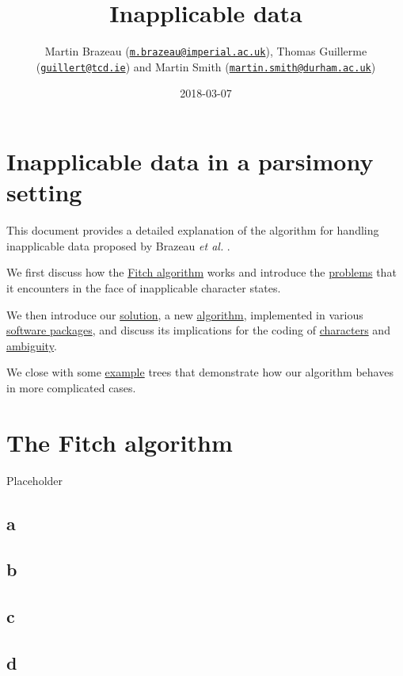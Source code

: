 \documentclass[]{book}
\title{Inapplicable data}
\author{Martin Brazeau
(\href{mailto:m.brazeau@imperial.ac.uk}{\nolinkurl{m.brazeau@imperial.ac.uk}}),
Thomas Guillerme
(\href{mailto:guillert@tcd.ie}{\nolinkurl{guillert@tcd.ie}}) and Martin
Smith
(\href{mailto:martin.smith@durham.ac.uk}{\nolinkurl{martin.smith@durham.ac.uk}})}
\date{2018-03-07}
\theoremstyle{definition}
\theoremstyle{definition}
\theoremstyle{definition}
\theoremstyle{remark}
\begin{document}
\maketitle

{
\setcounter{tocdepth}{1}
\tableofcontents
}
\hypertarget{inapplicable-data-in-a-parsimony-setting}{%
\chapter*{Inapplicable data in a parsimony
setting}\label{inapplicable-data-in-a-parsimony-setting}}

This document provides a detailed explanation of the algorithm for
handling inapplicable data proposed by Brazeau \emph{et al.}
\citeyearpar{ThisStudy}.

We first discuss how the \href{../fitch}{Fitch algorithm} works and
introduce the \url{problems} that it encounters in the face of
inapplicable character states.

We then introduce our \url{solution}, a new \url{algorithm}, implemented
in various \href{software}{software packages}, and discuss its
implications for the coding of \href{coding}{characters} and
\url{ambiguity}.

We close with some \href{examples}{example} trees that demonstrate how
our algorithm behaves in more complicated cases.

\hypertarget{fitch}{%
\chapter{The Fitch algorithm}\label{fitch}}

Placeholder

\hypertarget{a}{%
\section{a}\label{a}}

\hypertarget{b}{%
\section{b}\label{b}}

\hypertarget{c}{%
\section{c}\label{c}}

\hypertarget{d}{%
\section{d}\label{d}}
\end{document}
